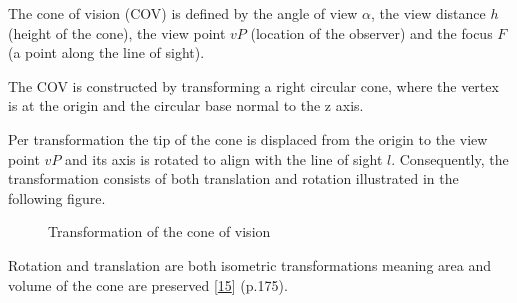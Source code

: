 \documentclass[letterpaper,10pt,english]{sphinxmanual}
\begin{document}
\sphinxAtStartPar
The cone of vision (COV) is defined by the angle of view \(\alpha\), the view distance \(h\) (height of the cone), the view point \(vP\) (location of the observer) and the focus \(F\) (a point along the line of sight).

\sphinxAtStartPar
The COV is constructed by transforming a right circular cone, where the vertex is at the origin and the circular base normal to the z axis.

\sphinxAtStartPar
Per transformation the tip of the cone is displaced from the origin to the view point \(vP\) and its axis is rotated to align with the line of sight \(l\).
Consequently, the transformation consists of both translation and rotation illustrated in the following figure.

\begin{figure}[htbp]
\centering
\capstart

\noindent{}
\caption{Transformation of the cone of vision}\label{\detokenize{NBodySimulation/Initialization:id42}}\label{\detokenize{NBodySimulation/Initialization:fig-cone}}\end{figure}

\sphinxAtStartPar
Rotation and translation are both isometric transformations meaning area and volume of the cone are preserved {[}\hyperlink{cite.NBodySimulation/Appendix:id9}{15}{]} (p.175).
\end{document}
